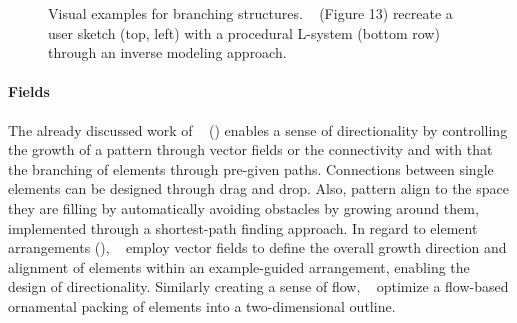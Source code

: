 \begin{figure}[H]
    \centering
    \caption{\label{fig:guo_2020_ipm} Visual examples for branching structures. \citeauthor*{guo_2020_ipm}~\cite{guo_2020_ipm} (Figure 13) recreate a user sketch (top, left) with a procedural L-system (bottom row) through an inverse modeling approach.}
\end{figure}

\paragraph*{Fields}
The already discussed work of \citeauthor*{gieseke_2017_ooo}~\cite{gieseke_2017_ooo} () enables a sense of directionality by controlling the growth of a pattern through vector fields or the connectivity and with that the branching of elements through pre-given paths. Connections between single elements can be designed through drag and drop. Also, pattern align to the space they are filling by automatically avoiding obstacles by growing around them, implemented through a shortest-path finding approach. In regard to element arrangements (), \citeauthor*{ijiri_2008_aeb}~\cite{ijiri_2008_aeb} employ vector fields to define the overall growth direction and alignment of elements within an example-guided arrangement, enabling the design of directionality. Similarly creating a sense of flow, \citeauthor*{saputra_2017_ffo}~\cite{saputra_2017_ffo} optimize a flow-based ornamental packing of elements into a two-dimensional outline. 


